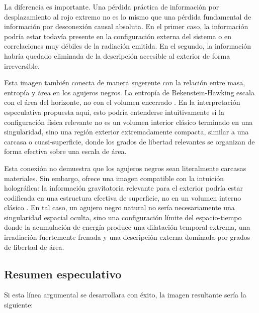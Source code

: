 \documentclass[
aps,
prd,
reprint,
superscriptaddress,
nofootinbib,
amsmath,
amssymb
]{revtex4-2}
\begin{document}
La diferencia es importante. Una pérdida práctica de información por desplazamiento al rojo extremo no es lo mismo que una pérdida fundamental de información por desconexión causal absoluta. En el primer caso, la información podría estar todavía presente en la configuración externa del sistema o en correlaciones muy débiles de la radiación emitida. En el segundo, la información habría quedado eliminada de la descripción accesible al exterior de forma irreversible.

Esta imagen también conecta de manera sugerente con la relación entre masa, entropía y área en los agujeros negros. La entropía de Bekenstein-Hawking escala con el área del horizonte, no con el volumen encerrado \cite{Bekenstein1973,BardeenCarterHawking1973,Hawking1975}. En la interpretación especulativa propuesta aquí, esto podría entenderse intuitivamente si la configuración física relevante no es un volumen interior clásico terminado en una singularidad, sino una región exterior extremadamente compacta, similar a una carcasa o cuasi-superficie, donde los grados de libertad relevantes se organizan de forma efectiva sobre una escala de área.

Esta conexión no demuestra que los agujeros negros sean literalmente carcasas materiales. Sin embargo, ofrece una imagen compatible con la intuición holográfica: la información gravitatoria relevante para el exterior podría estar codificada en una estructura efectiva de superficie, no en un volumen interno clásico \cite{Hooft1993,Susskind1995,Bousso2002,Maldacena1999}. En tal caso, un agujero negro natural no sería necesariamente una singularidad espacial oculta, sino una configuración límite del espacio-tiempo donde la acumulación de energía produce una dilatación temporal extrema, una irradiación fuertemente frenada y una descripción externa dominada por grados de libertad de área.

\subsection{Resumen especulativo}

Si esta línea argumental se desarrollara con éxito, la imagen resultante sería la siguiente:
\end{document}
